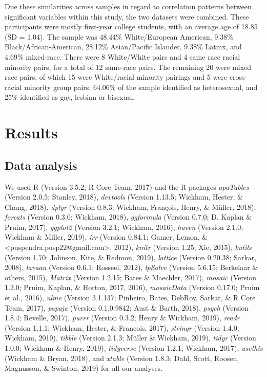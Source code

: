 \documentclass[man]{apa6}
\begin{document}
Due these similarities across samples in regard to correlation patterns
between significant variables within this study, the two datasets were
combined. These participants were mostly first-year college students,
with an average age of 18.85 (SD = 1.04). The sample was 48.44\%
White/European American, 9.38\% Black/African-American, 28.12\%
Asian/Pacific Islander, 9.38\% Latinx, and 4.69\% mixed-race. There were
8 White/White pairs and 4 same race racial minority pairs, for a total
of 12 same-race pairs. The remaining 20 were mixed race pairs, of which
15 were White/racial minority pairings and 5 were cross-racial minority
group pairs. 64.06\% of the sample identified as heterosexual, and 25\%
identified as gay, lesbian or bisexual.

\section{Results}\label{results}

\subsection{Data analysis}\label{data-analysis}

We used R (Version 3.5.2; R Core Team, 2017) and the R-packages
\emph{apaTables} (Version 2.0.5; Stanley, 2018), \emph{devtools}
(Version 1.13.5; Wickham, Hester, \& Chang, 2018), \emph{dplyr} (Version
0.8.3; Wickham, François, Henry, \& Müller, 2018), \emph{forcats}
(Version 0.3.0; Wickham, 2018), \emph{ggformula} (Version 0.7.0; D.
Kaplan \& Pruim, 2017), \emph{ggplot2} (Version 3.2.1; Wickham, 2016),
\emph{haven} (Version 2.1.0; Wickham \& Miller, 2019), \emph{irr}
(Version 0.84.1; Gamer, Lemon, \&
\textless{}puspendra.pusp22@gmail.com\textgreater{}, 2012), \emph{knitr}
(Version 1.25; Xie, 2015), \emph{kutils} (Version 1.70; Johnson, Kite,
\& Redmon, 2019), \emph{lattice} (Version 0.20.38; Sarkar, 2008),
\emph{lavaan} (Version 0.6.1; Rosseel, 2012), \emph{lpSolve} (Version
5.6.15; Berkelaar \& others, 2015), \emph{Matrix} (Version 1.2.15; Bates
\& Maechler, 2017), \emph{mosaic} (Version 1.2.0; Pruim, Kaplan, \&
Horton, 2017, 2016), \emph{mosaicData} (Version 0.17.0; Pruim et al.,
2016), \emph{nlme} (Version 3.1.137; Pinheiro, Bates, DebRoy, Sarkar, \&
R Core Team, 2017), \emph{papaja} (Version 0.1.0.9842; Aust \& Barth,
2018), \emph{psych} (Version 1.8.4; Revelle, 2017), \emph{purrr}
(Version 0.3.2; Henry \& Wickham, 2019), \emph{readr} (Version 1.1.1;
Wickham, Hester, \& Francois, 2017), \emph{stringr} (Version 1.4.0;
Wickham, 2019), \emph{tibble} (Version 2.1.3; Müller \& Wickham, 2019),
\emph{tidyr} (Version 1.0.0; Wickham \& Henry, 2019), \emph{tidyverse}
(Version 1.2.1; Wickham, 2017), \emph{usethis} (Wickham \& Bryan, 2018),
and \emph{xtable} (Version 1.8.3; Dahl, Scott, Roosen, Magnusson, \&
Swinton, 2019) for all our analyses.
\end{document}
